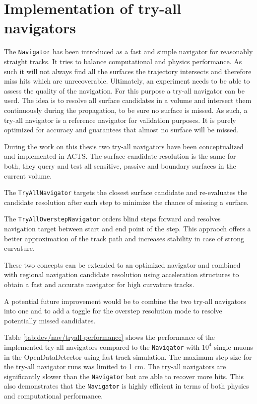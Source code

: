 \section{Implementation of try-all navigators}

The \texttt{Navigator} has been introduced as a fast and simple navigator for reasonably straight tracks. It tries to balance computational and physics performance. As such it will not always find all the surfaces the trajectory intersects and therefore miss hits which are unrecoverable. Ultimately, an experiment needs to be able to assess the quality of the navigation. For this purpose a try-all navigator can be used. The idea is to resolve all surface candidates in a volume and intersect them continuously during the propagation, to be sure no surface is missed. As such, a try-all navigator is a reference navigator for validation purposes. It is purely optimized for accuracy and guarantees that almost no surface will be missed.

During the work on this thesis two try-all navigators have been conceptualized and implemented in ACTS. The surface candidate resolution is the same for both, they query and test all sensitive, passive and boundary surfaces in the current volume.

The \texttt{TryAllNavigator} targets the closest surface candidate and re-evaluates the candidate resolution after each step to minimize the chance of missing a surface.

The \texttt{TryAllOverstepNavigator} orders blind steps forward and resolves navigation target between start and end point of the step. This appraoch offers a better approximation of the track path and increases stability in case of strong curvature.

These two concepts can be extended to an optimized navigator and combined with regional navigation candidate resolution using acceleration structures to obtain a fast and accurate navigator for high curvature tracks.

A potential future improvement would be to combine the two try-all navigators into one and to add a toggle for the overstep resolution mode to resolve potentially missed candidates.



Table \ref{tab:dev/nav/tryall-performance} shows the performance of the implemented try-all navigators compared to the \texttt{Navigator} with $10^4$ single muons in the OpenDataDetector using fast track simulation. The maximum step size for the try-all navigator runs was limited to 1 cm. The try-all navigators are significantly slower than the \texttt{Navigator} but are able to recover more hits. This also demonstrates that the \texttt{Navigator} is highly efficient in terms of both physics and computational performance.

